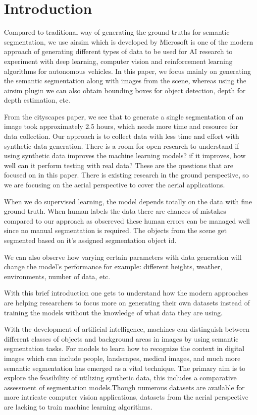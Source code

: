\documentclass[../report.tex]{subfiles}
\begin{document}
    \section{Introduction}
    \label{sec:introduction}
    Compared to traditional way of generating the ground truths for semantic segmentation, we use airsim which is developed by Microsoft is one of the modern approach of generating different types of data to be used for AI research to experiment with deep learning, computer vision and reinforcement learning algorithms for autonomous vehicles. 
    In this paper, we focus mainly on generating the semantic segmentation along with images from the scene, whereas using the airsim plugin we can also obtain bounding boxes for object detection, depth for depth estimation, etc. 

    From the cityscapes paper, we see that to generate a single segmentation of an image took approximately 2.5 hours, which needs more time and resource for data collection. Our approach is to collect data with less time and effort with synthetic data generation. There is a room for open research to understand if using synthetic data improves the machine learning models? if it improves, how well can it perform testing with real data? These are the questions that are focused on in this paper. There is existing research in the ground perspective, so we are focusing on the aerial perspective to cover the aerial applications. 

    When we do supervised learning, the model depends totally on the data with fine ground truth. When human labels the data there are chances of mistakes compared to our approach as obsereved these human errors can be managed well since no manual segmentation is required. The objects from the scene get segmented based on it's assigned segmentation object id. 

    We can also observe how varying certain parameters with data generation will change the model's performance for example: different heights, weather, environments, number of data, etc. 
    
    With this brief introduction one gets to understand how the modern approaches are helping researchers to focus more on generating their own datasets instead of training the models without the knowledge of what data they are using. 
    
    
    With the development of artificial intelligence, machines can distinguish between different classes of objects and background areas in images by using semantic segmentation tasks. For models to learn how to recognize the context in digital images which can include people, landscapes, medical images, and much more semantic segmentation has emerged as a vital technique. The primary aim is to explore the feasibility of utilizing synthetic data, this includes a comparative assessment of segmentation models.Though numerous datasets are available for more intricate computer vision applications, datasets from the aerial perspective are lacking to train machine learning algorithms. 
\end{document}
